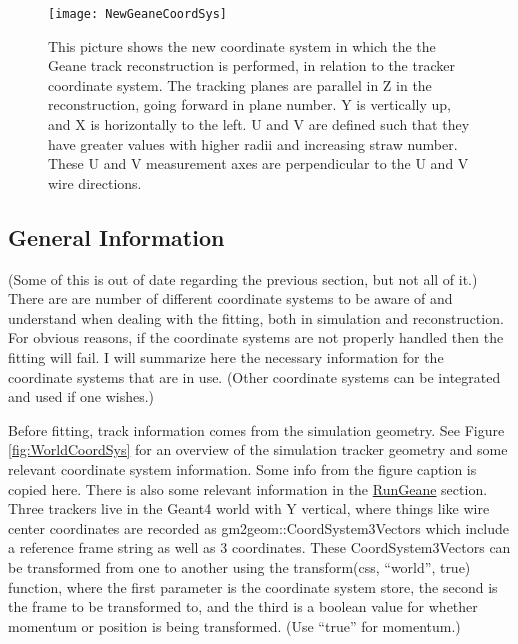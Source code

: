 		\begin{figure}[]
			\caption{This picture shows the new coordinate system in which the the Geane track reconstruction is performed, in relation to the tracker coordinate system. The tracking planes are parallel in Z in the reconstruction, going forward in plane number. Y is vertically up, and X is horizontally to the left. U and V are defined such that they have greater values with higher radii and increasing straw number. These U and V measurement axes are perpendicular to the U and V wire directions.}
		\centering
		\texttt{[image: NewGeaneCoordSys]}
		\label{fig:NewGeaneCoordSys}
		\end{figure}


\subsection{General Information}

	(Some of this is out of date regarding the previous section, but not all of it.) There are are number of different coordinate systems to be aware of and understand when dealing with the fitting, both in simulation and reconstruction. For obvious reasons, if the coordinate systems are not properly handled then the fitting will fail. I will summarize here the necessary information for the coordinate systems that are in use. (Other coordinate systems can be integrated and used if one wishes.)

	Before fitting, track information comes from the simulation geometry. See Figure \ref{fig:WorldCoordSys} for an overview of the simulation tracker geometry and some relevant coordinate system information. Some info from the figure caption is copied here. There is also some relevant information in the \hyperref[sec:RunGeane]{RunGeane} section. Three trackers live in the Geant4 world with Y vertical, where things like wire center coordinates are recorded as gm2geom::CoordSystem3Vectors which include a reference frame string as well as 3 coordinates. These CoordSystem3Vectors can be transformed from one to another using the transform(css, ``world'', true) function, where the first parameter is the coordinate system store, the second is the frame to be transformed to, and the third is a boolean value for whether momentum or position is being transformed. (Use ``true'' for momentum.)

